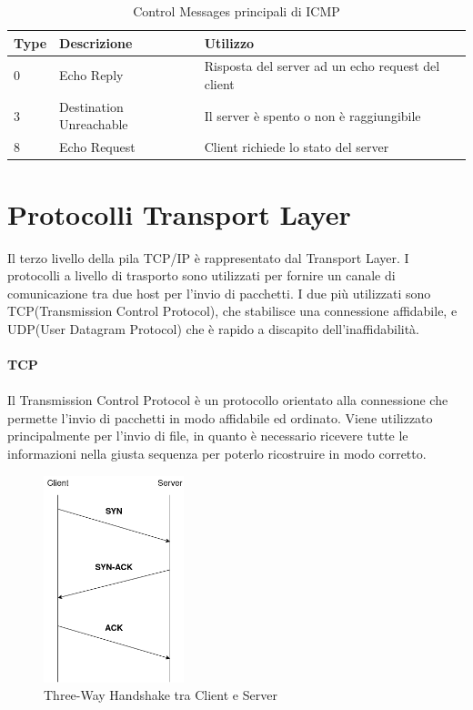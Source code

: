 \documentclass[12pt]{report}
\begin{document}
\begin{table}[htbp]
\centering
\begin{tabular}{@{}lll@{}}
\toprule
\textbf{Type} & \textbf{Descrizione} & \textbf{Utilizzo} \\ \midrule
0 & Echo Reply & Risposta del server ad un echo request del client \\
3 & Destination Unreachable & Il server è spento o non è raggiungibile \\
8 & Echo Request & Client richiede lo stato del server \\ \bottomrule
\end{tabular}
\caption{Control Messages principali di ICMP}
\label{tab:ICMPType}
\end{table}

\section{Protocolli Transport Layer}

Il terzo livello della pila TCP/IP è rappresentato dal Transport Layer. I protocolli a livello di trasporto sono utilizzati per fornire un canale di comunicazione tra due host per l'invio di pacchetti. I due più utilizzati sono TCP(Transmission Control Protocol), che stabilisce una connessione affidabile, e UDP(User Datagram Protocol) che è rapido a discapito dell'inaffidabilità. 
\\\\
\textbf{TCP}
\\\\
Il Transmission Control Protocol è un protocollo orientato alla connessione che permette l'invio di pacchetti in modo affidabile ed ordinato. Viene utilizzato principalmente per l'invio di file, in quanto è necessario ricevere tutte le informazioni nella giusta sequenza per poterlo ricostruire in modo corretto. \cite{rfcTCP}

\begin{figure}[htbp]
	\centering
	\includegraphics[width = 11em]{immagini/TCP3WH.drawio.png}
	\caption{Three-Way Handshake tra Client e Server}
	\label{fig:TCP3WH}
\end{figure}
\end{document}

